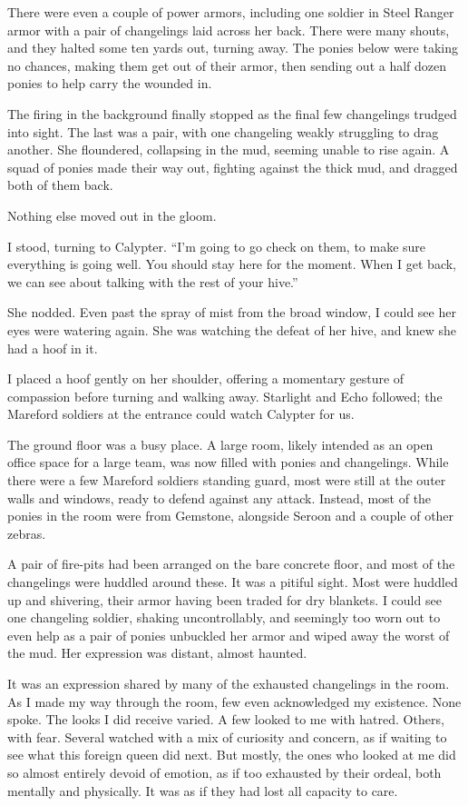There were even a couple of power armors, including one soldier in Steel Ranger armor with a pair of changelings laid across her back. There were many shouts, and they halted some ten yards out, turning away. The ponies below were taking no chances, making them get out of their armor, then sending out a half dozen ponies to help carry the wounded in.

The firing in the background finally stopped as the final few changelings trudged into sight. The last was a pair, with one changeling weakly struggling to drag another. She floundered, collapsing in the mud, seeming unable to rise again. A squad of ponies made their way out, fighting against the thick mud, and dragged both of them back.

Nothing else moved out in the gloom.

I stood, turning to Calypter. “I’m going to go check on them, to make sure everything is going well. You should stay here for the moment. When I get back, we can see about talking with the rest of your hive.”

She nodded. Even past the spray of mist from the broad window, I could see her eyes were watering again. She was watching the defeat of her hive, and knew she had a hoof in it.

I placed a hoof gently on her shoulder, offering a momentary gesture of compassion before turning and walking away. Starlight and Echo followed; the Mareford soldiers at the entrance could watch Calypter for us.

The ground floor was a busy place. A large room, likely intended as an open office space for a large team, was now filled with ponies and changelings. While there were a few Mareford soldiers standing guard, most were still at the outer walls and windows, ready to defend against any attack. Instead, most of the ponies in the room were from Gemstone, alongside Seroon and a couple of other zebras.

A pair of fire-pits had been arranged on the bare concrete floor, and most of the changelings were huddled around these. It was a pitiful sight. Most were huddled up and shivering, their armor having been traded for dry blankets. I could see one changeling soldier, shaking uncontrollably, and seemingly too worn out to even help as a pair of ponies unbuckled her armor and wiped away the worst of the mud. Her expression was distant, almost haunted.

It was an expression shared by many of the exhausted changelings in the room. As I made my way through the room, few even acknowledged my existence. None spoke. The looks I did receive varied. A few looked to me with hatred. Others, with fear. Several watched with a mix of curiosity and concern, as if waiting to see what this foreign queen did next. But mostly, the ones who looked at me did so almost entirely devoid of emotion, as if too exhausted by their ordeal, both mentally and physically. It was as if they had lost all capacity to care.

